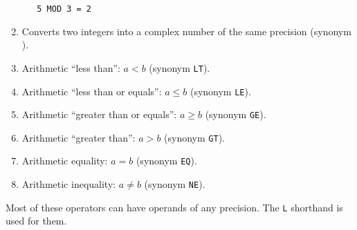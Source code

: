 \begin{enumerate}
\begin{verbatim}
   5 MOD 3 = 2
\end{verbatim}
\item {}\newline
Converts two integers into a complex number of the same precision
(synonym ).
\item {}\newline
Arithmetic ``less than'': $a<b$ (synonym \verb|LT|).
\item {}
\newline
Arithmetic ``less than or equals'': $a\leq b$ (synonym \verb|LE|).
\item {}\newline
Arithmetic ``greater than or equals'': $a\geq b$ (synonym \verb|GE|).
\item {}\newline
Arithmetic ``greater than'': $a>b$ (synonym \verb|GT|).
\item {}\newline
Arithmetic equality: $a=b$ (synonym \verb|EQ|).
\item {}\newline
Arithmetic inequality: $a\neq b$ (synonym \verb|NE|).
\end{enumerate}

Most of these operators can have operands of any precision. The
\verb|L| shorthand is used for them.

